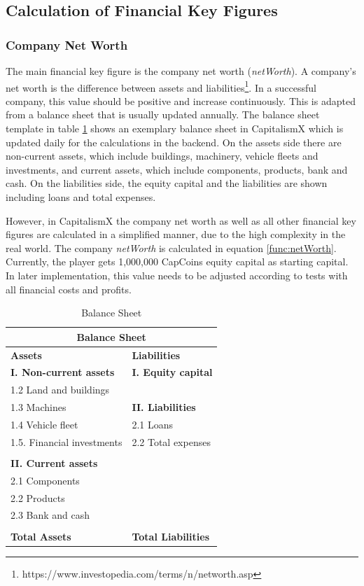 \subsection{Calculation of Financial Key Figures}
\subsubsection{Company Net Worth}
The main financial key figure is the company net worth (\textit{netWorth}). A company's net worth is the difference between assets and liabilities\footnote{https://www.investopedia.com/terms/n/networth.asp}. In a successful company, this value should be positive and increase continuously. This is adapted from a balance sheet that is usually updated annually. The balance sheet template in table \ref{tab:balanceSheet} shows an exemplary balance sheet in CapitalismX which is updated daily for the calculations in the backend. On the assets side there are non-current assets, which include buildings, machinery, vehicle fleets and investments, and current assets, which include components, products, bank and cash. On the liabilities side, the equity capital and the liabilities are shown including loans and total expenses. 

However, in CapitalismX the company net worth as well as all other financial key figures are calculated in a simplified manner, due to the high complexity in the real world. The company \textit{netWorth} is calculated in equation \ref{func:netWorth}. Currently, the player gets 1,000,000 CapCoins equity capital as starting capital. In later implementation, this value needs to be adjusted according to tests with all financial costs and profits.

\begin{table}[ht]
\begin{tabular}{|p{5.8cm}|p{5.8cm}|}
\hline
\multicolumn{2}{|c|}{\textbf{Balance Sheet}}\\
\hline \textbf{Assets} & \textbf{Liabilities}\\ 
\hline \textbf{I. Non-current assets} & \textbf{I. Equity capital}\\
\hline 1.2 Land and buildings &\\
\hline 1.3 Machines & \textbf{II. Liabilities}\\
\hline 1.4 Vehicle fleet & 2.1 Loans\\
\hline 1.5. Financial investments &  2.2 Total expenses\\
\hline &\\
\hline \textbf{II. Current assets} &\\
\hline 2.1 Components &\\
\hline 2.2 Products &\\
\hline 2.3 Bank and cash &\\
\hline &\\
\hline \textbf{Total Assets} & \textbf{Total Liabilities}\\
\hline
\end{tabular}
\caption{Balance Sheet}
\label{tab:balanceSheet}
\end{table}

